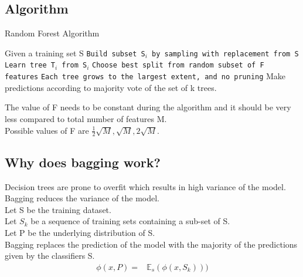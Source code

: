 \documentclass[12pt,letterpaper, onecolumn]{exam}
\begin{document}
\subsection*{Algorithm}
\begin{algorithm}
\caption{Random Forest Algorithm}\label{cap}
\begin{algorithmic}

\State Given a training set S
        \State \texttt{Build subset S$_i$ by sampling with replacement from S}
        \State \texttt{Learn tree T$_i$
from S$_i$}
\State \texttt{Choose best split from random subset of F features}
\State \texttt{Each tree grows to the largest extent, and no pruning}
\EndFor
      \EndFor
\State Make predictions according to majority vote of the set of k trees.
\end{algorithmic}
\end{algorithm}

The value of F needs to be constant during the algorithm and it should be very less compared to total number of features M.
\\Possible values of F are $\frac{1}{2}\sqrt{M},\sqrt{M},2\sqrt{M}$.



\subsection*{Why does bagging work?}
Decision trees are prone to overfit which results in high variance of the model. Bagging reduces the variance of the model.\\
Let S be the training dataset. \\
Let ${S_k}$ be a sequence of training sets containing a sub-set of S.\\
 Let P be the underlying distribution of S.\\
Bagging replaces the prediction of the model with the majority of 
the predictions given by the classifiers S.
\begin{align}
\phi(x,P) = {}& \mathbb{E}_s(\phi(x,S_k)))
\end{align}
\end{document}
